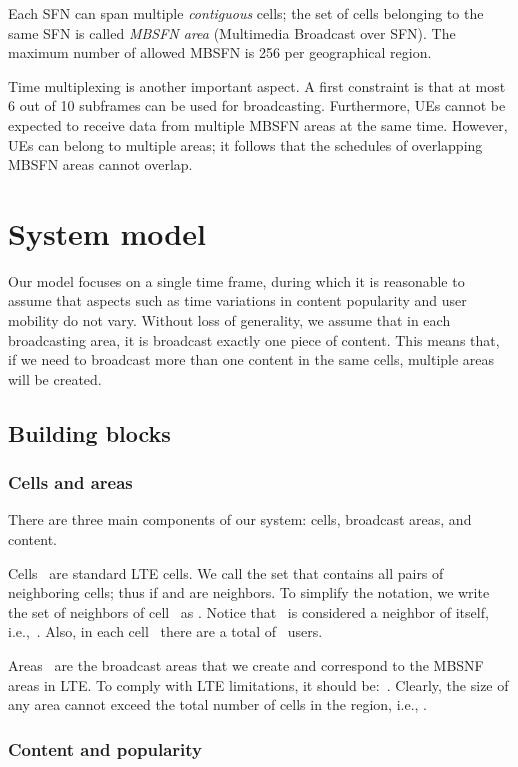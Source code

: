\documentclass[10pt, conference, compsocconf]{IEEEtran}
\numberwithin{equation}{section}
\begin{document}
Each SFN can span multiple {\em contiguous} cells; the set of cells belonging to the
same SFN is called {\em MBSFN area} (Multimedia Broadcast over SFN). The maximum number
of allowed MBSFN is 256 per geographical region.

Time multiplexing is another important aspect. A first constraint is that
at most 6 out of 10 subframes can be used for broadcasting.
Furthermore, UEs cannot be expected to receive data
from multiple MBSFN areas at the same time. However, UEs can belong to multiple areas;
it follows that the schedules of overlapping MBSFN areas cannot overlap.



\section{System model
\label{sec:model}
}

Our model focuses on a single time frame, during which it is
reasonable to assume that aspects such as time variations
in content popularity and user mobility do not vary.
Without loss of generality, 
we assume that in each broadcasting area, it is broadcast exactly one 
piece of content. This 
means that, if we need to broadcast more than one content in the same
cells, multiple areas will be created.

\subsection{Building blocks}

\subsubsection{Cells and areas}

There are three main components of our system: cells, broadcast areas, and content.

Cells~ are standard LTE cells. 
We call  the set that contains all pairs of neighboring cells;
thus  if  and  are neighbors.
To simplify the notation, we write the set of neighbors of cell~ as .
Notice that~ is considered a neighbor of itself, i.e.,~. Also, in each cell~ there are a total
of~ users.

Areas~ are the broadcast areas that we create and  correspond to the MBSNF areas
in LTE. To comply with LTE limitations, it should be:~. Clearly, the size of any area cannot exceed the total number of
cells in the region, i.e., . 

\subsubsection{Content and popularity}
\end{document}
